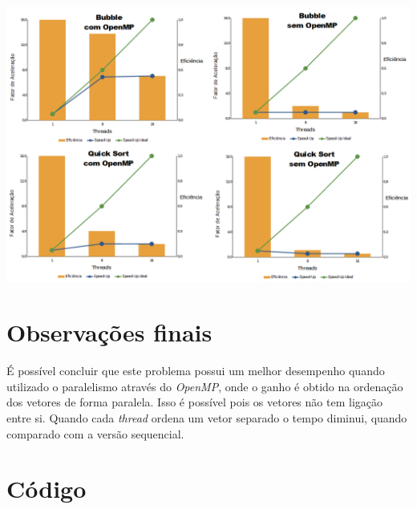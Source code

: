 \documentclass[12pt]{article}
\newenvironment{Figure}
  {\par\medskip\noindent\minipage{\linewidth}}
  {\endminipage\par\medskip}
\begin{document}
{\begin{multicols}{2}
\begin{Figure}
\centering
\includegraphics[width=\columnwidth]{fig/new.png}
\label{fig:grafico}
\end{Figure}


\section{Observações finais} 
É possível concluir que este problema possui um melhor desempenho quando utilizado o paralelismo através do \textit{OpenMP}, onde o ganho é obtido na ordenação dos vetores de forma paralela. Isso é possível pois os vetores não tem ligação entre si. Quando cada \textit{thread} ordena um vetor separado o tempo diminui, quando comparado com a versão sequencial. 

\end{multicols}

\newpage{}
\section{Código}

}
\end{document}
